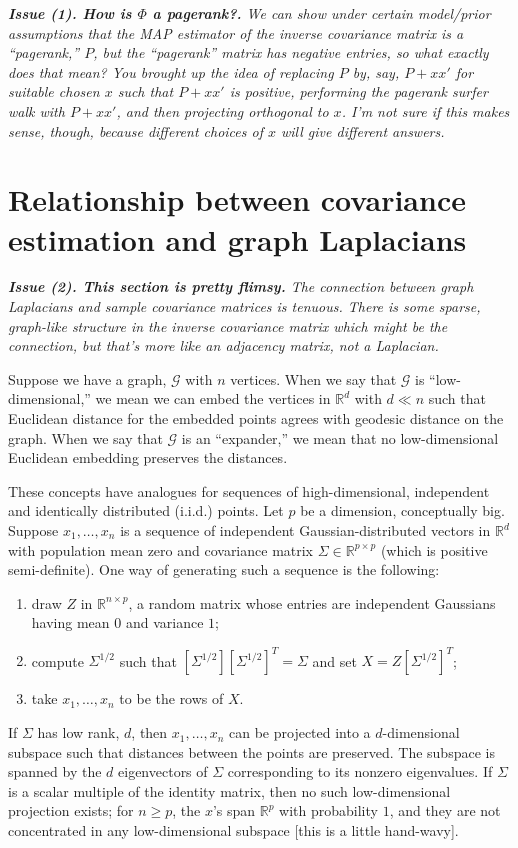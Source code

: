 \documentclass{article}
\begin{document}
\textit{\textbf{Issue (1). How is $\Phi$ a pagerank?.}
We can show under certain model/prior assumptions that the MAP estimator of the inverse covariance matrix is a ``pagerank,'' $P$, but the ``pagerank'' matrix has negative entries, so what exactly does that mean?  You brought up the idea of replacing $P$ by, say, $P + x x'$ for suitable chosen $x$ such that $P + x x'$ is positive, performing the pagerank surfer walk with $P + x x'$, and then projecting orthogonal to $x$.  I'm not sure if this makes sense, though, because different choices of $x$ will give different answers.}


\section{Relationship between covariance estimation and graph Laplacians}

\textit{\textbf{Issue (2). This section is pretty flimsy.} The connection between graph Laplacians and sample covariance matrices is tenuous.  There is some sparse, graph-like structure in the inverse covariance matrix which might be the connection, but that's more like an adjacency matrix, not a Laplacian.}

Suppose we have a graph, $\mathcal{G}$ with $n$ vertices.  When we
say that $\mathcal{G}$ is ``low-dimensional,'' we mean we can embed the
vertices in $\mathbb{R}^d$ with $d \ll n$ such that Euclidean distance
for the embedded points agrees with geodesic distance on the graph.  When
we say that $\mathcal{G}$ is an ``expander,'' we mean that no low-dimensional
Euclidean embedding preserves the distances.

These concepts have analogues for sequences of high-dimensional,
independent and identically distributed (i.i.d.) points.  Let $p$ be
a dimension, conceptually big.  Suppose $x_1, \ldots, x_n$ is a sequence
of independent Gaussian-distributed vectors in $\mathbb{R}^d$ with population
mean zero and covariance matrix $\Sigma \in \mathbb{R}^{p \times p}$ 
(which is positive semi-definite).  One way of generating such a sequence
is the following:
\begin{enumerate}
    \item draw $Z$ in $\mathbb{R}^{n \times p}$, a random matrix whose
        entries are independent Gaussians having mean $0$ and variance $1$;
    \item compute $\Sigma^{1/2}$ such that
        $[\Sigma^{1/2}] [\Sigma^{1/2}]^T = \Sigma$ and set
        $X = Z [\Sigma^{1/2}]^{T}$;
    \item take $x_1, \ldots, x_n$ to be the rows of $X$.
\end{enumerate}
If $\Sigma$ has low rank, $d$, then $x_1, \ldots, x_n$ can be projected
into a $d$-dimensional subspace such that distances between the points
are preserved.  The subspace is spanned by the $d$ eigenvectors of
$\Sigma$ corresponding to its nonzero eigenvalues.  If $\Sigma$ is
a scalar multiple of the identity matrix, then no such low-dimensional
projection exists; for $n \geq p$, the $x$'s span $\mathbb{R}^p$ with
probability $1$, and they are not concentrated in any low-dimensional
subspace [this is a little hand-wavy].
\end{document}
